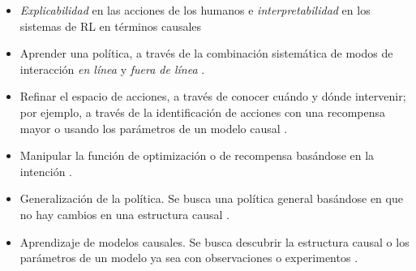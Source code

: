 \begin{itemize}
    \item \textit{Explicabilidad} en las acciones de los humanos e \textit{interpretabilidad} en los sistemas de RL en términos causales \cite{Gershman2017, madumal2019explainable, edmonds2018human}
    \item Aprender una política, a través de la combinación sistemática de modos de interacción \textit{en línea} y \textit{fuera de línea} \cite{CausalRL2019EliasB}.
    \item Refinar el espacio de acciones, a través de conocer cuándo y dónde intervenir; por ejemplo, a través de la identificación de acciones con una recompensa mayor \cite{lattimore2016causal} o 
    usando los parámetros de un modelo causal \cite{playingagainstnature2018}.
    \item Manipular la función de optimización o de recompensa basándose en la intención \cite{CausalRL2019EliasB, everitt2019reward}. 
    \item  Generalización de la política. Se busca una política general
    basándose en que no hay cambios en una estructura causal \cite{CausalRL2019EliasB}.
    \item Aprendizaje de modelos causales. Se busca descubrir la estructura causal
    o los parámetros de un modelo ya sea con observaciones \cite{lu2018deconfounding, zhu2019causal}
    o experimentos \cite{nair2019causal, gonzalezsoto2020causal, dasgupta2019causal}.
\end{itemize}

    

 
 
